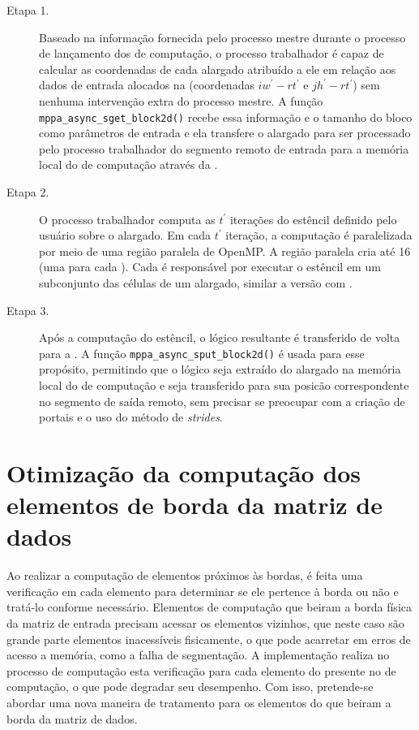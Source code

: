 \begin{description}

	\item[Etapa 1.] Baseado na informação fornecida pelo processo mestre durante o processo de lançamento dos \clusters de computação, o processo trabalhador é capaz de calcular as coordenadas de cada \tile alargado atribuído a ele em relação aos dados de entrada alocados na \lpddr (coordenadas $iw^\prime - rt^\prime$ e $jh^\prime - rt^\prime$) sem nenhuma intervenção extra do processo mestre. A função \texttt{mppa\_async\_sget\_block2d()} recebe essa informação e o tamanho do bloco como parâmetros de entrada e ela transfere o \tile alargado para ser processado pelo processo trabalhador do segmento remoto de entrada para a memória local do \cluster de computação através da \noc.

	\item[Etapa 2.] O processo trabalhador computa as $t^\prime$ iterações do  estêncil definido pelo usuário sobre o \tile alargado. Em cada $t^\prime$ iteração, a computação é paralelizada por meio de uma região paralela de OpenMP. A região paralela cria até 16 \threads (uma para cada \pe). Cada \pe é responsável por executar o  estêncil em um subconjunto das células de um \tile alargado, similar a versão com \ipc.

	\item[Etapa 3.] Após a computação do  estêncil, o \tile lógico resultante é transferido de volta para a \lpddr. A função \texttt{mppa\_async\_sput\_block2d()} é usada para esse propósito, permitindo que o \tile lógico seja extraído do \tile alargado na memória local do \cluster de computação e seja transferido para sua posicão correspondente no segmento de saída remoto, sem precisar se preocupar com a criação de portais e o uso do método de \textit{strides}.

\end{description}

\section{Otimização da computação dos elementos de borda da matriz de dados}
\label{sec:otimizacao-bordas}

Ao realizar a computação de elementos próximos às bordas, é feita uma verificação em cada elemento para determinar se ele pertence à borda ou não e tratá-lo conforme necessário. Elementos de computação que beiram a borda física da matriz de entrada precisam acessar os elementos vizinhos, que neste caso são grande parte elementos inacessíveis fisicamente, o que pode acarretar em erros de acesso a memória, como a falha de segmentação. A implementação \ipc realiza no processo de computação esta verificação para cada elemento do \tile presente no \cluster de computação, o que pode degradar seu desempenho. Com isso, pretende-se abordar uma nova maneira de tratamento para os elementos do \tile que beiram a borda da matriz de dados. 

